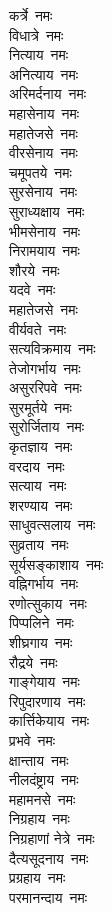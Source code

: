 \begin{multicols}{2}
\begin{flushleft}
कर्त्रे~नमः\\
विधात्रे~नमः\\
नित्याय~नमः\\
अनित्याय~नमः\\
अरिमर्दनाय~नमः\\
महासेनाय~नमः\\
महातेजसे~नमः\\
वीरसेनाय~नमः\\
चमूपतये~नमः\hfill{}\\
सुरसेनाय~नमः\\
सुराध्यक्षाय~नमः\\
भीमसेनाय~नमः\\
निरामयाय~नमः\\
शौरये~नमः\\
यदवे~नमः\\
महातेजसे~नमः\\
वीर्यवते~नमः\\
सत्यविक्रमाय~नमः\\
तेजोगर्भाय~नमः\hfill{}\\
असुररिपवे~नमः\\
सुरमूर्तये~नमः\\
सुरोर्जिताय~नमः\\
कृतज्ञाय~नमः\\
वरदाय~नमः\\
सत्याय~नमः\\
शरण्याय~नमः\\
साधुवत्सलाय~नमः\\
सुव्रताय~नमः\\
सूर्यसङ्काशाय~नमः\hfill{}\\
वह्निगर्भाय~नमः\\
रणोत्सुकाय~नमः\\
पिप्पलिने~नमः\\
शीघ्रगाय~नमः\\
रौद्रये~नमः\\
गाङ्गेयाय~नमः\\
रिपुदारणाय~नमः\\
कार्त्तिकेयाय~नमः\\
प्रभवे~नमः\\
क्षान्ताय~नमः\hfill{}\\
नीलदंष्ट्राय~नमः\\
महामनसे~नमः\\
निग्रहाय~नमः\\
निग्रहाणां नेत्रे~नमः\\
दैत्यसूदनाय~नमः\\
प्रग्रहाय~नमः\\
परमानन्दाय~नमः\\

\end{flushleft}
\end{multicols}
